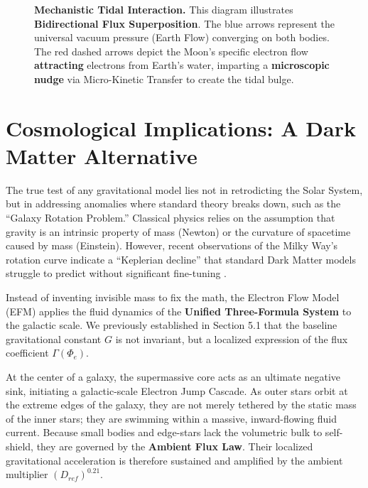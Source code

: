 \documentclass[11pt, a4paper]{article}
\begin{document}
\begin{figure}[!ht]
\caption{\textbf{Mechanistic Tidal Interaction.} This diagram illustrates \textbf{Bidirectional Flux Superposition}. The blue arrows represent the universal vacuum pressure (Earth Flow) converging on both bodies. The red dashed arrows depict the Moon's specific electron flow \textbf{attracting} electrons from Earth's water, imparting a \textbf{microscopic nudge} via Micro-Kinetic Transfer to create the tidal bulge.}
\label{fig:tidal_mechanism}
\end{figure}

\clearpage
\section{Cosmological Implications: A Dark Matter Alternative}

The true test of any gravitational model lies not in retrodicting the Solar System, but in addressing anomalies where standard theory breaks down, such as the ``Galaxy Rotation Problem.'' Classical physics relies on the assumption that gravity is an intrinsic property of mass (Newton) or the curvature of spacetime caused by mass (Einstein). However, recent observations of the Milky Way's rotation curve \cite{Jiao2023} indicate a ``Keplerian decline'' that standard Dark Matter models struggle to predict without significant fine-tuning \cite{Bullock2017}.

Instead of inventing invisible mass to fix the math, the Electron Flow Model (EFM) applies the fluid dynamics of the \textbf{Unified Three-Formula System} to the galactic scale. We previously established in Section 5.1 that the baseline gravitational constant $G$ is not invariant, but a localized expression of the flux coefficient $\Gamma(\Phi_e)$. 

At the center of a galaxy, the supermassive core acts as an ultimate negative sink, initiating a galactic-scale Electron Jump Cascade. As outer stars orbit at the extreme edges of the galaxy, they are not merely tethered by the static mass of the inner stars; they are swimming within a massive, inward-flowing fluid current. Because small bodies and edge-stars lack the volumetric bulk to self-shield, they are governed by the \textbf{Ambient Flux Law}. Their localized gravitational acceleration is therefore sustained and amplified by the ambient multiplier $(D_{ref})^{0.21}$. 
\end{document}
